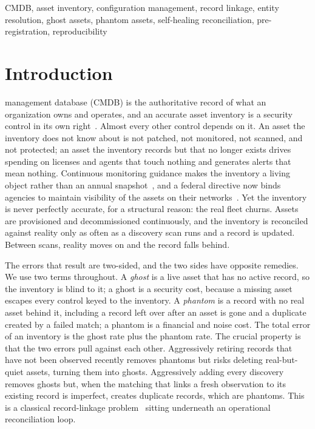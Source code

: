 \documentclass[journal]{IEEEtran}
\begin{document}
\begin{IEEEkeywords}
CMDB, asset inventory, configuration management, record linkage, entity resolution, ghost assets,
phantom assets, self-healing reconciliation, pre-registration, reproducibility
\end{IEEEkeywords}

\section{Introduction}
 management database (CMDB) is the authoritative record of what an
organization owns and operates, and an accurate asset inventory is a security control in its own
right~\cite{nist80053,cisabod2301}. Almost every other control depends on it. An asset the inventory
does not know about is not patched, not monitored, not scanned, and not protected; an asset the
inventory records but that no longer exists drives spending on licenses and agents that touch
nothing and generates alerts that mean nothing. Continuous monitoring guidance makes the inventory a
living object rather than an annual snapshot~\cite{nist80137,nist80137a}, and a federal directive now
binds agencies to maintain visibility of the assets on their networks~\cite{cisabod2301}. Yet the
inventory is never perfectly accurate, for a structural reason: the real fleet churns. Assets are
provisioned and decommissioned continuously, and the inventory is reconciled against reality only as
often as a discovery scan runs and a record is updated. Between scans, reality moves on and the
record falls behind.

The errors that result are two-sided, and the two sides have opposite remedies. We use two terms
throughout. A \emph{ghost} is a live asset that has no active record, so the inventory is blind to
it; a ghost is a security cost,
because a missing asset escapes every control keyed to the inventory. A \emph{phantom} is a record
with no real asset behind it, including a
record left over after an asset is gone and a duplicate created by a failed match; a phantom is a
financial and noise cost. The total error of an inventory is the ghost rate plus the phantom rate.
The crucial property is that the two errors pull against each other. Aggressively retiring records
that have not been observed recently removes phantoms but risks deleting real-but-quiet assets,
turning them into ghosts. Aggressively adding every discovery removes ghosts but, when the matching
that links a fresh observation to its existing record is imperfect, creates duplicate records, which
are phantoms. This is a classical record-linkage problem~\cite{fellegi1969linkage,christen2012matching}
sitting underneath an operational reconciliation loop.
\end{document}

